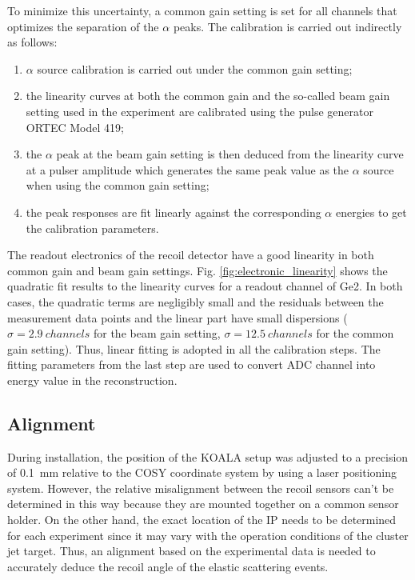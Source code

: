 \documentclass[number,5p]{elsarticle}
\begin{document}
To minimize this uncertainty, a common gain setting is set for all channels that optimizes the separation of the \(\alpha\) peaks.
The calibration is carried out indirectly as follows:
\begin{enumerate}
\item \(\alpha\) source calibration is carried out under the common gain setting;
\item the linearity curves at both the common gain and the so-called beam gain
  setting used in the experiment are calibrated using the pulse generator ORTEC Model 419;
\item the $\alpha$ peak at the beam gain setting is then deduced
  from the linearity curve at a pulser amplitude which generates the same peak
  value as the $\alpha$ source when using the common gain setting;
\item the peak responses are fit linearly against the corresponding $\alpha$ energies
  to get the calibration parameters.
\end{enumerate}
The readout electronics of the recoil detector have a good linearity in both common gain and beam gain settings.
Fig. \ref{fig:electronic_linearity} shows the quadratic fit results to the linearity curves for a readout channel of Ge2.
In both cases, the quadratic terms are negligibly small and the residuals
between the measurement data points and the linear part have small dispersions
($\sigma=\SI{2.9}{channels}$ for the beam gain setting, $\sigma=\SI{12.5}{channels}$ for the common gain setting).
Thus, linear fitting is adopted in all the calibration steps.
The fitting parameters from the last step are used to convert ADC channel into
energy value in the reconstruction.

\subsection{Alignment}
\label{sec:alignment}

During installation, the position of the KOALA setup was adjusted to a precision
of \SI{0.1}{\mm} relative to the COSY coordinate system by using a laser positioning system.
However, the relative misalignment between the recoil sensors can't be
determined in this way because they are mounted together on a common sensor holder.
On the other hand, the exact location of the IP needs to be determined for each experiment since
it may vary with the operation conditions of the cluster jet target.
Thus, an alignment based on the experimental data is needed to accurately deduce the recoil angle of the elastic scattering events.
\end{document}
